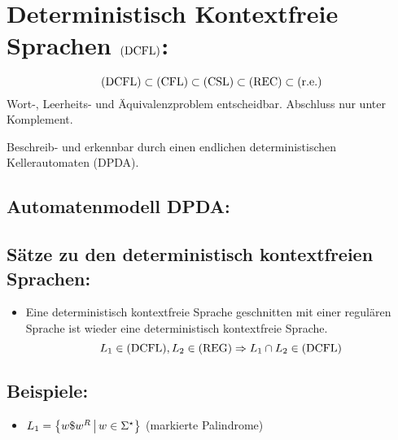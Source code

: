 \chapter{Deterministisch Kontextfreie Sprachen $\mathrm{(DCFL)}$:}
\begin{equation*}
	\mathrm{(DCFL)}\subset\mathrm{(CFL)}\subset\mathrm{(CSL)}\subset\mathrm{(REC)}\subset\mathrm{(r.e.)}
\end{equation*}
Wort-, Leerheits- und Äquivalenzproblem entscheidbar. Abschluss nur unter Komplement.

Beschreib- und erkennbar durch einen endlichen deterministischen Kellerautomaten (DPDA).



\section{Automatenmodell DPDA:}\label{dcfl:dpda}


\section{Sätze zu den deterministisch kontextfreien Sprachen:}
\begin{itemize}
	\item Eine deterministisch kontextfreie Sprache geschnitten mit einer regulären Sprache ist wieder eine deterministisch kontextfreie Sprache.
	\begin{equation*}
		L_1\in\mathrm{(DCFL)}, L_2\in\mathrm{(REG)} \Rightarrow L_1\cap L_2\in\mathrm{(DCFL)}
\end{equation*}
\end{itemize}

\section{Beispiele: }
\begin{itemize}
	\item $L_1=\left\{ w\$w^R \,\middle|\, w\in\Sigma^\star \right\}$ (markierte Palindrome)
\end{itemize}
